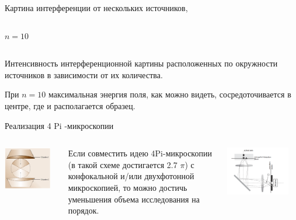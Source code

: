 \documentclass[9pt, compress, xcolor=table]{beamer}
\begin{document}
\begin{frame}{Картина интерференции от нескольких источников,}
\begin{columns}[c]
\begin{center}
$n=10$
\end{center}
\end{columns}


Интенсивность интерференционной картины расположенных по окружности источников в зависимости от их количества.

При $n=10$ максимальная энергия поля, как можно видеть, сосредоточивается в центре, где и располагается образец.
\end{frame}

\begin{frame}{Реализация 4 Pi -микроскопии}
\begin{columns}[c]
\column{6cm}
\begin{center}
\includegraphics[width=0.9\textwidth]{ffm02}
\end{center}
{\small Если совместить идею 4Pi-микроскопии (в такой схеме достигается 2.7 $\pi$) с конфокальной и/или двухфотонной микроскопией, то можно достичь уменьшения объема исследования на порядок.}
\column{6.5cm}
\begin{center}
\includegraphics[width=0.85\textwidth]{ffm02a}


\end{center}
\end{columns}
\end{frame}
\end{document}
